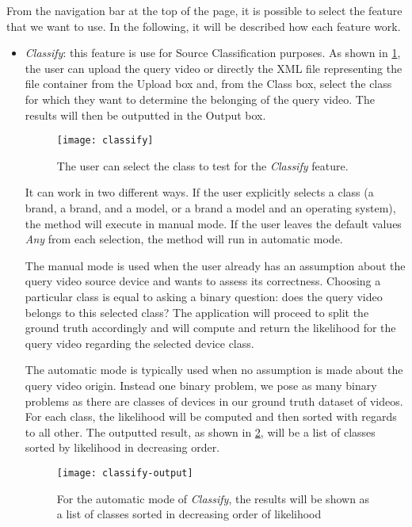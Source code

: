 From the navigation bar at the top of the page, it is possible to select the feature that we want to use. In the following, it will be described how each feature work.

\begin{itemize}

\item \emph{Classify}: this feature is use for Source Classification purposes. As shown in \ref{fig:classify}, the user can upload the query video or directly the XML file representing the file container from the Upload box and, from the Class box, select the class for which they want to determine the belonging of the query video. The results will then be outputted in the Output box. 

\begin{figure}
  \centering
  \texttt{[image: classify]}
  \caption{The user can select the class to test for the \emph{Classify} feature.}\label{fig:classify}
\end{figure}

It can work in two different ways. If the user explicitly selects a class (a brand, a brand, and a model, or a brand a model and an operating system), the method will execute in manual mode. If the user leaves the default values \emph{Any} from each selection, the method will run in automatic mode.

The manual mode is used when the user already has an assumption about the query video source device and wants to assess its correctness. Choosing a particular class is equal to asking a binary question: does the query video belongs to this selected class? The application will proceed to split the ground truth accordingly and will compute and return the likelihood for the query video regarding the selected device class.

The automatic mode is typically used when no assumption is made about the query video origin. Instead one binary problem, we pose as many binary problems as there are classes of devices in our ground truth dataset of videos. For each class, the likelihood will be computed and then sorted with regards to all other. The outputted result, as shown in \ref{fig:classify-output}, will be a list of classes sorted by likelihood in decreasing order.

\begin{figure}
  \centering
  \texttt{[image: classify-output]}
  \caption{For the automatic mode of \emph{Classify}, the results will be shown as a list of classes sorted in decreasing order of likelihood}\label{fig:classify-output}
\end{figure}


\end{itemize}
